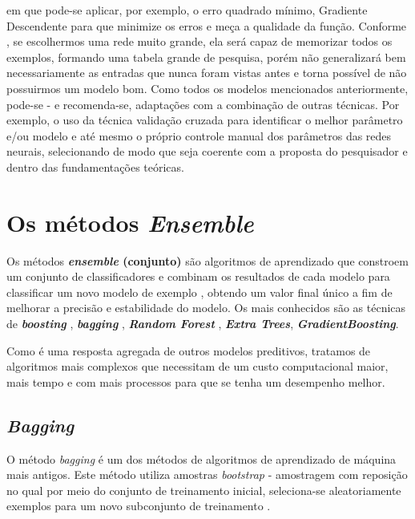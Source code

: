 \documentclass[
  openany]{book}
\begin{document}
em que pode-se aplicar, por exemplo, o erro quadrado mínimo, Gradiente Descendente para que minimize os erros e meça a qualidade da função. Conforme \citet{russel2004inteligencia}, se escolhermos uma rede muito grande, ela será capaz de memorizar todos os exemplos, formando uma tabela grande de pesquisa, porém não generalizará bem necessariamente as entradas que nunca
foram vistas antes e torna possível de não possuirmos um modelo bom. Como todos os modelos mencionados anteriormente, pode-se - e recomenda-se, adaptações com a combinação de outras técnicas. Por exemplo, o uso da técnica validação cruzada para identificar o melhor parâmetro e/ou modelo e até mesmo o próprio controle manual dos parâmetros das redes neurais, selecionando de modo que seja coerente com a proposta do pesquisador e dentro das fundamentações teóricas.

\hypertarget{ptIII}{%
\chapter{\texorpdfstring{Os métodos \emph{Ensemble}}{Os métodos Ensemble}}\label{ptIII}}

Os métodos \textbf{\emph{ensemble} (conjunto)} são algoritmos de aprendizado que constroem um conjunto de classificadores e combinam os resultados de cada modelo para classificar um novo modelo de exemplo \citep{dietterich2000ensemble}, obtendo um valor final único a fim de melhorar a precisão e estabilidade do modelo. Os mais conhecidos são as técnicas de \textbf{\emph{boosting}} \citep{freund1996experiments}, \textbf{\emph{bagging}} \citep{breiman1996bagging}, \textbf{\emph{Random Forest}} \citep{breiman2001random, liaw2002classification}, \textbf{\emph{Extra Trees}}, \textbf{\emph{GradientBoosting}}.

Como é uma resposta agregada de outros modelos preditivos, tratamos de algoritmos mais complexos que necessitam de um custo computacional maior, mais tempo e com mais processos para que se tenha um desempenho melhor.

\hypertarget{bagging}{%
\section{\texorpdfstring{\emph{Bagging}}{Bagging}}\label{bagging}}

O método \emph{bagging} \citep{breiman1996bagging} é um dos métodos de algoritmos de aprendizado de máquina mais antigos. Este método utiliza amostras \emph{bootstrap} - amostragem com reposição no qual por meio do conjunto de treinamento inicial, seleciona-se aleatoriamente exemplos para um novo subconjunto de treinamento \citep{oshiro2013abordagem}.
\end{document}
